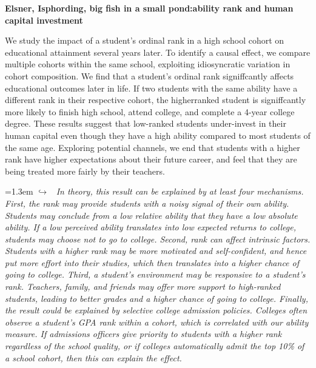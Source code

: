 \documentclass[11pt]{article}
\newcommand{\entry}[3]{%
  \par\medskip\noindent\textbf{#1}\par
  \nopagebreak #2\hspace{0.35em}{\small\color{tagcol}[#3]}\par}
\newcommand{\note}[1]{\par\smallskip\noindent\hangindent=1.3em
  \textcolor{notecol}{\footnotesize$\hookrightarrow$~\textit{#1}}}
\begin{document}
 \entry{Elsner, Isphording, big fish in a small pond:ability rank and human capital investment}{We study the impact of a student's ordinal rank in a high school cohort on educational attainment several years later. To identify a causal effect, we compare multiple cohorts within the same school, exploiting idiosyncratic variation in cohort composition. We find that a student's ordinal rank signiffcantly affects educational outcomes later in life. If two students with the same ability have a different rank in their respective cohort, the higherranked student is signiffcantly more likely to finish high school, attend college, and complete a 4-year college degree. These results suggest that low-ranked students under-invest in their human capital even though they have a high ability compared to most students of the same age. Exploring potential channels, we end that students with a higher rank have higher expectations about their future career, and feel that they are being treated more fairly by their teachers.
}{rt}
\note{ In theory, this result can be explained by at least four mechanisms. First, the rank may provide students with a noisy signal of their own ability. Students may conclude from a low relative ability that they have a low absolute ability. If a low perceived ability translates into low expected returns to college, students may choose not to go to college. Second, rank can affect intrinsic factors. Students with a higher rank may be more motivated and self-confident, and hence put more effort into their studies, which then translates into a higher chance of going to college. Third, a student's environment may be responsive to a student's rank. Teachers, family, and friends may offer more support to high-ranked students, leading to better grades and a higher chance of going to college. Finally, the result could be explained by selective college admission policies. Colleges often observe a student's GPA rank within a cohort, which is correlated with our ability measure. If admissions officers give priority to students with a higher rank regardless of the school quality, or if colleges automatically admit the top 10\% of a school cohort, then this can explain the effect.
 }
\end{document}
